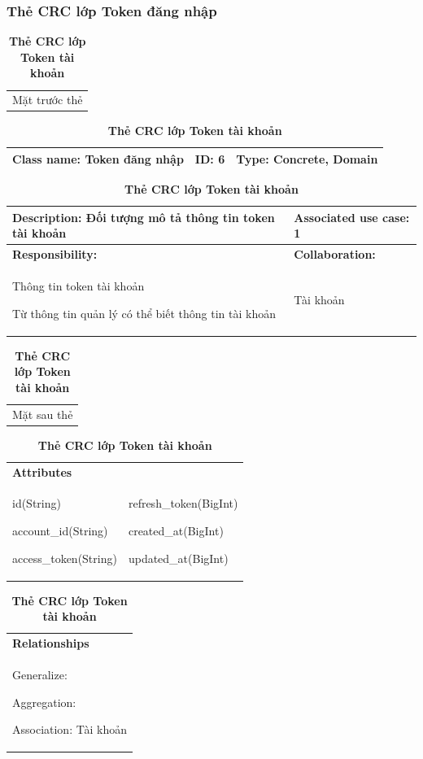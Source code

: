 \subsubsection{Thẻ CRC lớp Token đăng nhập}
  \begin{table}[H]
    \caption{\bfseries \fontsize{12pt}{0pt}\selectfont Thẻ CRC lớp Token tài khoản}
    \centering
    \begin{tabularx}{0.9\textwidth}{X}
      Mặt trước thẻ
    \end{tabularx}
    \begin{tabularx}{0.9\textwidth}{|X|X|X|}
      \hline
      \textbf{Class name:} Token đăng nhập & \textbf{ID:} 6 & \textbf{Type:} Concrete, Domain \\
      \hline
    \end{tabularx}
    \begin{tabularx}{0.9\textwidth}{|X|X|}
      \textbf{Description:} Đối tượng mô tả thông tin token tài khoản & \textbf{Associated use case:} 1 \\
      \hline
      \textbf{Responsibility:} & \textbf{Collaboration:} \\
      Thông tin token tài khoản

      Từ thông tin quản lý có thể biết thông tin tài khoản
      & 
      Tài khoản
      \\
      \hline
    \end{tabularx}
    \begin{tabularx}{0.9\textwidth}{X}
      Mặt sau thẻ
    \end{tabularx}
    \begin{tabularx}{0.9\textwidth}{|X|X|}
      \hline
      \textbf{Attributes} & \\
      id(String) 
      
      account\_id(String)

      access\_token(String)
      & 
      refresh\_token(BigInt) 
            
      created\_at(BigInt)

      updated\_at(BigInt)
      \\
      \hline
    \end{tabularx}
    \begin{tabularx}{0.9\textwidth}{|X|}
      \textbf{Relationships} \\
      Generalize:  

      Aggregation:  
      
      Association: Tài khoản 
      \\
      \hline
    \end{tabularx}
  \end{table}

